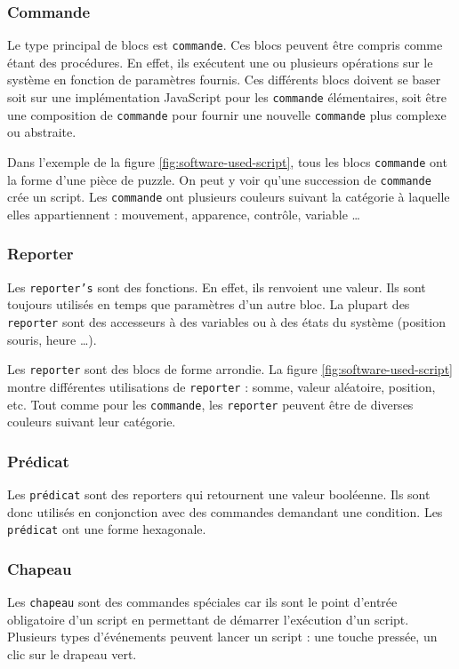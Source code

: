 \subsubsection{Commande}
Le type principal de blocs est \texttt{commande}. Ces blocs peuvent être compris comme étant des procédures. En effet, ils exécutent une ou plusieurs opérations sur le système en fonction de paramètres fournis. Ces différents blocs doivent se baser soit sur une implémentation JavaScript pour les \texttt{commande} élémentaires, soit être une composition de \texttt{commande} pour fournir une nouvelle \texttt{commande} plus complexe ou abstraite.

Dans l'exemple de la figure \ref{fig:software-used-script}, tous les blocs \texttt{commande} ont la forme d'une pièce de puzzle. On peut y voir qu'une succession de \texttt{commande} crée un script. Les \texttt{commande} ont plusieurs couleurs suivant la catégorie à laquelle elles appartiennent : mouvement, apparence, contrôle, variable \ldots

\subsubsection{Reporter}
Les \texttt{reporter's} sont des fonctions. En effet, ils renvoient une valeur. Ils sont toujours utilisés en temps que paramètres d'un autre bloc. La plupart des \texttt{reporter} sont des accesseurs à des variables ou à des états du système (position souris, heure \ldots).

Les \texttt{reporter} sont des blocs de forme arrondie. La figure \ref{fig:software-used-script} montre différentes utilisations de \texttt{reporter} : somme, valeur aléatoire, position, etc. Tout comme pour les \texttt{commande}, les \texttt{reporter} peuvent être de diverses couleurs suivant leur catégorie.

\subsubsection{Prédicat}
Les \texttt{prédicat} sont des reporters qui retournent une valeur booléenne. Ils sont donc utilisés en conjonction avec des commandes demandant une condition. Les \texttt{prédicat} ont une forme hexagonale.

\subsubsection{Chapeau}
Les \texttt{chapeau} sont des commandes spéciales car ils sont le point d'entrée obligatoire d'un script en permettant de démarrer l'exécution d'un script. Plusieurs types d'événements peuvent lancer un script : une touche pressée, un clic sur le drapeau vert.

